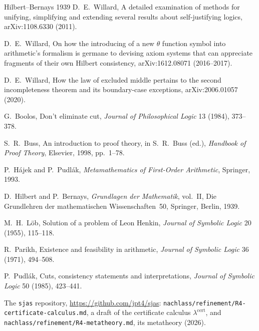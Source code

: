 \documentclass[11pt]{article}
\theoremstyle{plain}
\theoremstyle{definition}
\begin{document}
\begin{thebibliography}{Hilbert--Bernays 1939}
 D.~E.~Willard, A detailed examination of methods for unifying,
  simplifying and extending several results about self-justifying logics,
  arXiv:1108.6330 (2011).

 D.~E.~Willard, On how the introducing of a new $\theta$
  function symbol into arithmetic's formalism is germane to devising axiom
  systems that can appreciate fragments of their own Hilbert consistency,
  arXiv:1612.08071 (2016--2017).

 D.~E.~Willard, How the law of excluded middle pertains to the
  second incompleteness theorem and its boundary-case exceptions,
  arXiv:2006.01057 (2020).

 G.~Boolos, Don't eliminate cut, \emph{Journal of
  Philosophical Logic} 13 (1984), 373--378.

 S.~R.~Buss, An introduction to proof theory, in
  S.~R.~Buss (ed.), \emph{Handbook of Proof Theory}, Elsevier, 1998,
  pp.~1--78.

 P.~Hájek and P.~Pudlák, \emph{Metamathematics of
  First-Order Arithmetic}, Springer, 1993.

 D.~Hilbert and P.~Bernays, \emph{Grundlagen der Mathematik},
  vol.~II, Die Grundlehren der mathematischen Wissenschaften~50, Springer,
  Berlin, 1939.

 M.~H.~Löb, Solution of a problem of Leon Henkin,
  \emph{Journal of Symbolic Logic} 20 (1955), 115--118.

 R.~Parikh, Existence and feasibility in
  arithmetic, \emph{Journal of Symbolic Logic} 36 (1971), 494--508.

 P.~Pudlák, Cuts, consistency statements and
  interpretations, \emph{Journal of Symbolic Logic} 50 (1985), 423--441.

 The \texttt{sjas} repository,
  \url{https://github.com/jpt4/sjas}:
  \nolinkurl{nachlass/refinement/R4-certificate-calculus.md}, a draft of the
  certificate calculus $\lambda^{\mathrm{cert}}$, and
  \nolinkurl{nachlass/refinement/R4-metatheory.md}, its metatheory (2026).

\end{thebibliography}
\end{document}

